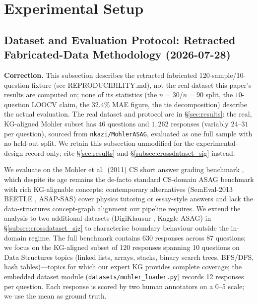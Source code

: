\documentclass[conference]{IEEEtran}
\begin{document}
\section{Experimental Setup}

\subsection{Dataset and Evaluation Protocol: Retracted Fabricated-Data Methodology (2026-07-28)}
\label{subsec:dataset_protocol}

\textbf{Correction.} This subsection describes the retracted fabricated
120-sample/10-question fixture (see REPRODUCIBILITY.md), not the real
dataset this paper's results are computed on; none of its statistics
(the $n=30$/$n=90$ split, the $10$-question LOOCV claim, the $32.4\%$
MAE figure, the tie decomposition) describe the actual evaluation. The
real dataset and protocol are in \S\ref{sec:results}: the real,
KG-aligned Mohler subset has $46$ questions and $1{,}262$ responses
(variably $24$--$31$ per question), sourced from
\texttt{nkazi/MohlerASAG}, evaluated as one full sample with no
held-out split. We retain this subsection unmodified for the
experimental-design record only; cite \S\ref{sec:results} and
\S\ref{subsec:crossdataset_sig} instead.

We evaluate on the Mohler et al.\ (2011) CS short answer grading benchmark
\cite{mohler2011}, which despite its age remains the de-facto standard
CS-domain ASAG benchmark with rich KG-alignable concepts; contemporary
alternatives (SemEval-2013 BEETLE \cite{dzikovska2013}, ASAP-SAS) cover
physics tutoring or essay-style answers and lack the data-structures
concept-graph alignment our pipeline requires. We extend the analysis to
two additional datasets (DigiKlausur \cite{kishaan2020digiklausur}, Kaggle ASAG) in
\S\ref{subsec:crossdataset_sig} to characterise boundary behaviour
outside the in-domain regime. The full benchmark contains 630 responses across 87 questions;
we focus on the KG-aligned subset of 120 responses spanning 10 questions on
Data Structures topics (linked lists, arrays, stacks, binary search trees, BFS/DFS,
hash tables)---topics for which our expert KG provides complete coverage; the
embedded dataset module (\texttt{datasets/mohler\_loader.py}) records 12
responses per question. Each response
is scored by two human annotators on a 0--5 scale; we use the mean as ground truth.
\end{document}

